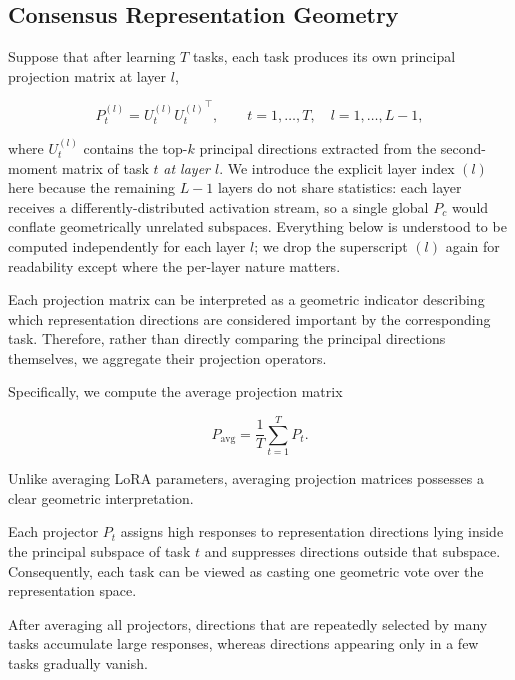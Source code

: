 \documentclass[a4paper]{article}
\begin{document}

\subsection{Consensus Representation Geometry}

Suppose that after learning $T$ tasks, each task produces its own principal projection matrix at layer $l$,

\begin{equation}
P_t^{(l)}
=
U_t^{(l)}{U_t^{(l)}}^\top,
\qquad
t=1,\ldots,T,\quad l=1,\ldots,L-1,
\end{equation}

where $U_t^{(l)}$ contains the top-$k$ principal directions extracted from the second-moment matrix of task $t$ \emph{at layer $l$}. We introduce the explicit layer index $(l)$ here because the remaining $L-1$ layers do not share statistics: each layer receives a differently-distributed activation stream, so a single global $P_c$ would conflate geometrically unrelated subspaces. Everything below is understood to be computed independently for each layer $l$; we drop the superscript $(l)$ again for readability except where the per-layer nature matters.

Each projection matrix can be interpreted as a geometric indicator describing which representation directions are considered important by the corresponding task. Therefore, rather than directly comparing the principal directions themselves, we aggregate their projection operators.

Specifically, we compute the average projection matrix

\begin{equation}
P_{\mathrm{avg}}
=
\frac{1}{T}
\sum_{t=1}^{T}
P_t.
\end{equation}

Unlike averaging LoRA parameters, averaging projection matrices possesses a clear geometric interpretation.

Each projector $P_t$ assigns high responses to representation directions lying inside the principal subspace of task $t$ and suppresses directions outside that subspace. Consequently, each task can be viewed as casting one geometric vote over the representation space.

After averaging all projectors, directions that are repeatedly selected by many tasks accumulate large responses, whereas directions appearing only in a few tasks gradually vanish.
\end{document}
